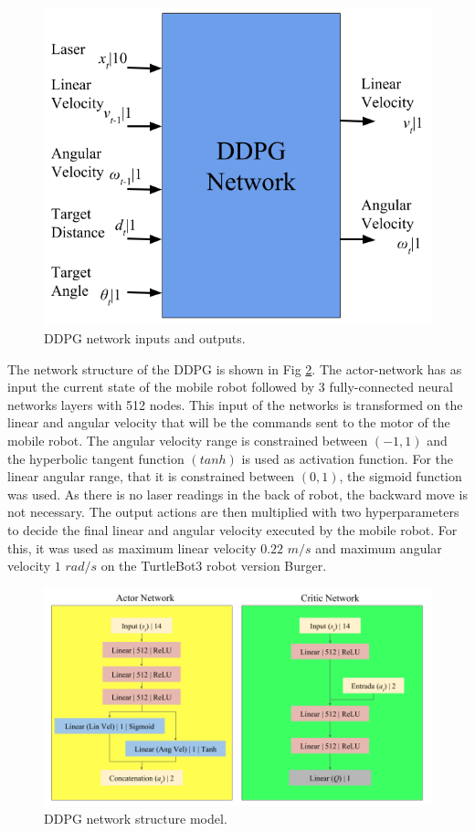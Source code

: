 \begin{figure}[htbp]
\centerline{\includegraphics[width=\columnwidth]{images/o_and_i.png}}
\caption{DDPG network inputs and outputs.}
\label{fig:entradaESaida}
\end{figure}

The network structure of the DDPG is shown in Fig \ref{fig:projetointegrador}. 
The actor-network has as input the current state of the mobile robot followed by 3 fully-connected neural networks layers with 512 nodes.
This input of the networks is transformed on the linear and angular velocity that will be the commands sent to the motor of the mobile robot. 
The angular velocity range is constrained between $(-1,1)$ and the hyperbolic tangent function $(tanh)$ is used as activation function.
For the linear angular range, that it is constrained between $(0,1)$, the sigmoid function was used.
As there is no laser readings in the back of robot, the backward move is not necessary.
The output actions are then multiplied with two hyperparameters to decide the final linear and angular velocity executed by the mobile robot.
For this, it was used as maximum linear velocity $0.22$ $m/s$ and maximum angular velocity $1$ $rad/s$ on the TurtleBot3 robot version Burger.


\begin{figure}[htbp]
\centerline{\includegraphics[width=\columnwidth]{images/projeto_integrador_en.png}}
\caption{DDPG network structure model.}
\label{fig:projetointegrador}
\end{figure}

